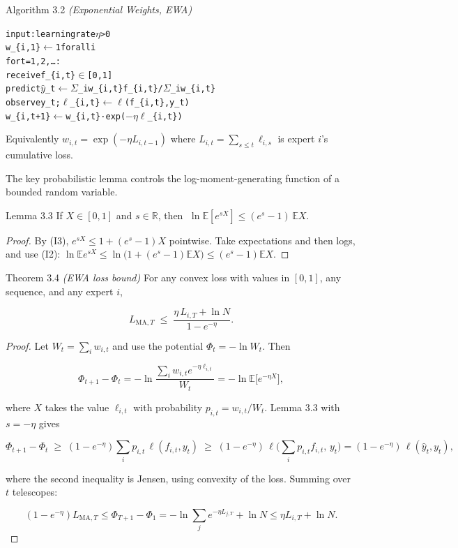 \documentclass[11pt,a4paper,openany]{book}
\newcommand{\R}{\mathbb{R}}
\newcommand{\E}{\mathbb{E}}
\newcommand{\hy}{\hat{y}}
\newenvironment{algo}{\par\smallskip\begingroup\footnotesize\begin{alltt}}{\end{alltt}\endgroup\smallskip}
\begin{document}
\begin{balg}{Algorithm 3.2 \emph{(Exponential Weights, EWA)}}
\begin{algo}
input: learning rate \ensuremath{\eta} > 0
w\_\{i,1\} \ensuremath{\leftarrow} 1 for all i
for t = 1, 2, …:
    receive f\_\{i,t\} \ensuremath{\in} [0,1]
    predict \ensuremath{\hat{y}}\_t \ensuremath{\leftarrow} \ensuremath{\Sigma}\_i w\_\{i,t\} f\_\{i,t\} / \ensuremath{\Sigma}\_i w\_\{i,t\}
    observe y\_t;   \ensuremath{\ell}\_\{i,t\} \ensuremath{\leftarrow} \ensuremath{\ell}(f\_\{i,t\}, y\_t)
    w\_\{i,t+1\} \ensuremath{\leftarrow} w\_\{i,t\} · exp(\ensuremath{-}\ensuremath{\eta} \ensuremath{\ell}\_\{i,t\})
\end{algo}

Equivalently $w_{i,t}=\exp(-\eta L_{i,t-1})$ where $L_{i,t}=\sum_{s\le t}\ell_{i,s}$ is expert $i$'s cumulative loss.
\end{balg}

The key probabilistic lemma controls the log-moment-generating function of a bounded random variable.

\begin{bthm}{Lemma 3.3}
If $X\in[0,1]$ and $s\in\R$, then $\;\ln\E[e^{sX}]\le(e^s-1)\,\E X$.
\end{bthm}

\begin{proof}
By (I3), $e^{sX}\le1+(e^s-1)X$ pointwise. Take expectations and then logs, and use (I2): $\ln\E e^{sX}\le\ln\big(1+(e^s-1)\E X\big)\le(e^s-1)\E X$.
\end{proof}

\begin{bthm}{Theorem 3.4 \emph{(EWA loss bound)}}
For any convex loss with values in $[0,1]$, any sequence, and any expert $i$,

\[L_{\mathrm{MA},T}\;\le\;\frac{\eta\,L_{i,T}+\ln N}{1-e^{-\eta}}.\]

\end{bthm}

\begin{proof}
Let $W_t=\sum_iw_{i,t}$ and use the potential $\Phi_t=-\ln W_t$. Then

\[\Phi_{t+1}-\Phi_t=-\ln\frac{\sum_iw_{i,t}e^{-\eta\ell_{i,t}}}{W_t}=-\ln\E\big[e^{-\eta X}\big],\]

where $X$ takes the value $\ell_{i,t}$ with probability $p_{i,t}=w_{i,t}/W_t$. Lemma 3.3 with $s=-\eta$ gives

\[\Phi_{t+1}-\Phi_t\;\ge\;(1-e^{-\eta})\sum_ip_{i,t}\,\ell(f_{i,t},y_t)\;\ge\;(1-e^{-\eta})\,\ell\Big(\sum_ip_{i,t}f_{i,t},\,y_t\Big)=(1-e^{-\eta})\,\ell(\hy_t,y_t),\]

where the second inequality is Jensen, using convexity of the loss. Summing over $t$ telescopes:

\[(1-e^{-\eta})L_{\mathrm{MA},T}\le\Phi_{T+1}-\Phi_1=-\ln\sum_je^{-\eta L_{j,T}}+\ln N\le\eta L_{i,T}+\ln N.\]

\end{proof}
\end{document}
